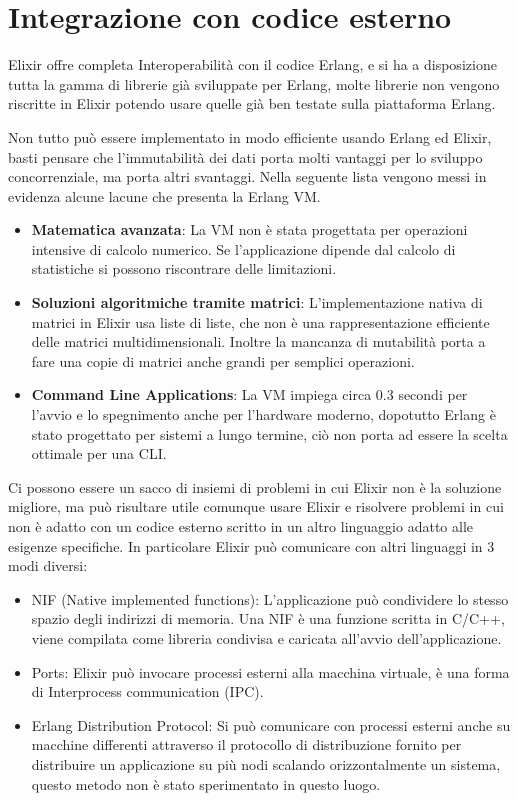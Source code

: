 \section{Integrazione con codice esterno}\label{subsec:mysubsection}
Elixir offre completa Interoperabilità
con il codice Erlang, e si ha a disposizione tutta la gamma di librerie
già sviluppate per Erlang, molte librerie non vengono riscritte in Elixir
potendo usare quelle già ben testate sulla piattaforma Erlang.

Non tutto può essere implementato in modo efficiente
usando Erlang ed Elixir, basti pensare che l'immutabilità dei dati
porta molti vantaggi per lo sviluppo concorrenziale, ma porta altri
svantaggi. Nella seguente lista vengono messi in evidenza alcune
lacune che presenta la Erlang VM.

\begin{itemize}
	\item \textbf{Matematica avanzata}: La VM non è stata progettata per operazioni
	intensive di calcolo numerico. Se l'applicazione dipende dal calcolo di
	statistiche si possono riscontrare delle limitazioni.
	\item \textbf{Soluzioni algoritmiche tramite matrici}: L'implementazione
	nativa di matrici in Elixir usa liste di liste, che non è una rappresentazione
	efficiente delle matrici multidimensionali. Inoltre la mancanza di mutabilità
	porta a fare una copie di matrici anche grandi per semplici operazioni.
	\item \textbf{Command Line Applications}: La VM impiega circa 0.3 secondi
	per l'avvio e lo spegnimento anche per l'hardware moderno, dopotutto Erlang
	è stato progettato per sistemi a lungo termine, ciò non porta ad essere
	la scelta ottimale per una CLI.
\end{itemize}

Ci possono essere un sacco di insiemi di problemi in cui Elixir
non è la soluzione migliore, ma può risultare utile comunque
usare Elixir e risolvere problemi in cui non è adatto
con un codice esterno scritto in un altro linguaggio adatto
alle esigenze specifiche.
In particolare Elixir può comunicare con altri linguaggi
in 3 modi diversi:

\begin{itemize}
	\item NIF (Native implemented functions): L'applicazione può condividere lo stesso
	spazio degli indirizzi di memoria.
	Una NIF è una funzione scritta in C/C++, viene compilata
	come libreria condivisa e caricata all'avvio dell'applicazione.
	\item Ports: Elixir può invocare processi esterni alla macchina
	virtuale, è una forma di Interprocess communication (IPC).
	\item Erlang Distribution Protocol: Si può comunicare con
	processi esterni anche su macchine differenti
	attraverso il protocollo di distribuzione fornito per distribuire
	un applicazione su più nodi scalando orizzontalmente un sistema,
	questo metodo non è stato sperimentato in questo luogo.
\end{itemize}


